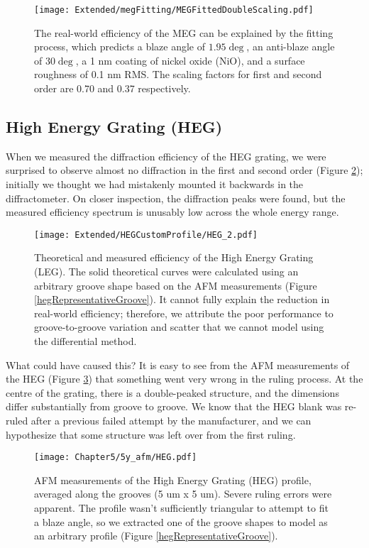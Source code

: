 \begin{figure}[htbp] %
   \centering
   \texttt{[image: Extended/megFitting/MEGFittedDoubleScaling.pdf]} 
   \caption{The real-world efficiency of the MEG can be explained by the fitting process, which predicts a blaze angle of $1.95\deg$, an anti-blaze angle of $30 \deg$, a 1 nm coating of nickel oxide (NiO), and a surface roughness of 0.1 nm RMS.  The scaling factors for first and second order are 0.70 and 0.37 respectively. }
   \label{5x-meg}
\end{figure}

\subsection{High Energy Grating (HEG)}
When we measured the diffraction efficiency of the HEG grating, we were surprised to observe almost no diffraction in the first and second order (Figure \ref{5x-heg}); initially we thought we had mistakenly mounted it backwards in the diffractometer.  On closer inspection, the diffraction peaks were found, but the measured efficiency spectrum is unusably low across the whole energy range.

\begin{figure}[htbp] %
   \centering
   \texttt{[image: Extended/HEGCustomProfile/HEG\_2.pdf]} 
   \caption{Theoretical and measured efficiency of the High Energy Grating (LEG).  The solid theoretical curves were calculated using an arbitrary groove shape based on the AFM measurements (Figure \ref{hegRepresentativeGroove}).  It cannot fully explain the reduction in real-world efficiency; therefore, we attribute the poor performance to groove-to-groove variation and scatter that we cannot model using the differential method.}
   \label{5x-heg}
\end{figure}

What could have caused this? It is easy to see from the AFM measurements of the HEG (Figure \ref{5y-heg}) that something went very wrong in the ruling process.  At the centre of the grating, there is a double-peaked structure, and the dimensions differ substantially from groove to groove.  We know that the HEG blank was re-ruled after a previous failed attempt by the manufacturer, and we can hypothesize that some structure was left over from the first ruling.

\begin{figure}[htbp] %
   \centering
   \texttt{[image: Chapter5/5y\_afm/HEG.pdf]} 
   \caption{AFM measurements of the High Energy Grating (HEG) profile, averaged along the grooves (5 um x 5 um).  Severe ruling errors were apparent.  The profile wasn't sufficiently triangular to attempt to fit a blaze angle, so we extracted one of the groove shapes to model as an arbitrary profile (Figure \ref{hegRepresentativeGroove}).}
   \label{5y-heg}
\end{figure}

